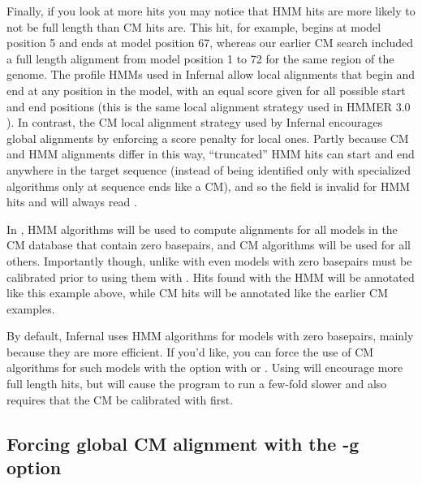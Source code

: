 Finally, if you look at more hits you may notice that HMM hits are
more likely to not be full length than CM hits are. This hit, for
example, begins at model position 5 and ends at model position 67,
whereas our earlier CM search included a full length alignment from
model position 1 to 72 for the same region of the genome. The profile
HMMs used in Infernal allow local alignments that begin and end at any
position in the model, with an equal score given for all possible
start and end positions (this is the same local alignment strategy
used in HMMER 3.0 \cite{Eddy08}). In contrast, the CM local alignment
strategy used by Infernal encourages global alignments by enforcing a
score penalty for local ones. Partly because CM and HMM alignments
differ in this way, ``truncated'' HMM hits can start and end anywhere
in the target sequence (instead of being identified only with
specialized algorithms only at sequence ends like a CM), and so the
 field is invalid for HMM hits and will always read
\otext{-}.

In , HMM algorithms will be used to compute alignments
for all models in the CM database that contain zero basepairs, and CM
algorithms will be used for all others. Importantly though, unlike with
 even models with zero basepairs must be calibrated
prior to using them with . Hits found with the HMM will
be annotated like this example above, while CM hits will be annotated
like the earlier CM examples.

By default, Infernal uses HMM algorithms for models with zero
basepairs, mainly because they are more efficient. If you'd like, you
can force the use of CM algorithms for such models with the
 option with  or . Using
 will encourage more full length hits, but will
cause the program to run a few-fold slower and also requires that the
CM be calibrated with  first.

\subsection{Forcing global CM alignment with the -g option}

